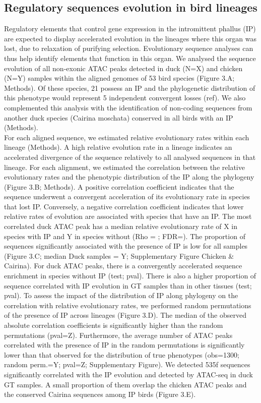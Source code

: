 \subsection{Regulatory sequences evolution in bird lineages}
Regulatory elements that control gene expression in the intromittent phallus (IP) are expected to display accelerated evolution in the lineages where this organ was lost, due to relaxation of purifying selection. Evolutionary sequence analyses can thus help identify elements that function in this organ. We analysed the sequence evolution of all non-exonic ATAC peaks detected in duck (N=X) and chicken (N=Y) samples within the aligned genomes of 53 bird species (Figure 3.A; Methods). Of these species, 21 possess an IP and the phylogenetic distribution of this phenotype would represent 5 independent convergent losses (ref). We also complemented this analysis with the identification of non-coding sequences from another duck species (Cairina moschata) conserved in all birds with an IP (Methods). \\

For each aligned sequence, we estimated relative evolutionary rates within each lineage (Methods). A high relative evolution rate in a lineage indicates an accelerated divergence of the sequence relatively to all analysed sequences in that lineage. For each alignment, we estimated the correlation between the relative evolutionary rates and the phenotypic distribution of the IP along the phylogeny (Figure 3.B; Methods). A positive correlation coefficient indicates that the sequence underwent a convergent acceleration of its evolutionary rate in species that lost IP. Conversely, a negative correlation coefficient indicates that lower relative rates of evolution are associated with species that have an IP. The most correlated duck ATAC peak has a median relative evolutionary rate of X in species with IP and Y in species without (Rho = ; FDR=). The proportion of sequences significantly associated with the presence of IP is low for all samples (Figure 3.C; median Duck samples = Y; Supplementary Figure Chicken & Cairina). For duck ATAC peaks, there is a convergently accelerated sequence enrichment in species without IP (test; pval). There is also a higher proportion of sequence correlated with IP evolution in GT samples than in other tissues (test; pval). To assess the impact of the distribution of IP along phylogeny on the correlation with relative evolutionary rates, we performed random permutations of the presence of IP across lineages (Figure 3.D). The median of the observed absolute correlation coefficients is significantly higher than the random permutations (pval=Z). Furthermore, the average number of ATAC peaks correlated with the presence of IP in the random permutations is significantly lower than that observed for the distribution of true phenotypes (obs=1300; random perm.=Y; pval=Z; Supplementary Figure). We detected 535f sequences significantly correlated with the IP evolution and detected by ATAC-seq in duck GT samples. A small proportion of them overlap the chicken ATAC peaks and the conserved Cairina sequences among IP birds (Figure 3.E).

